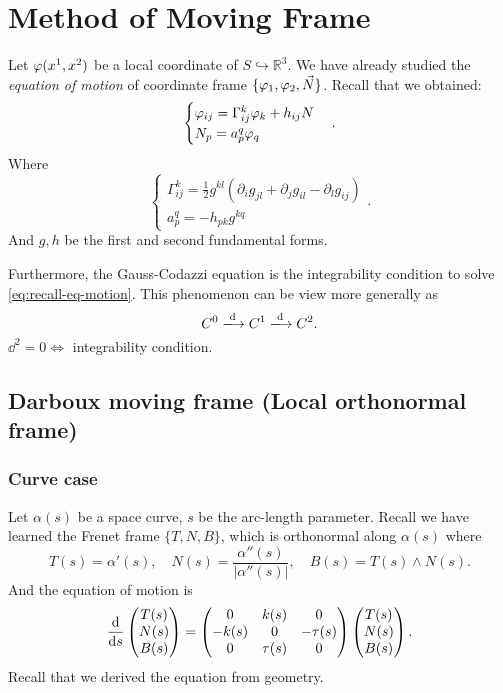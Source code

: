 \section{Method of Moving Frame}
Let \(\varphi(x^1,x^2)\) be a local coordinate of \(S\hookrightarrow\mathbb{R}^3\).
We have already studied the \emph{equation of motion} of coordinate frame \(\{\varphi_1,
\varphi_2,\vec{N}\}\). Recall that we obtained: 
\begin{equation}\label{eq:recall-eq-motion}
    \begin{cases}
        \varphi_{ij}=\Gamma_{ij}^k\varphi_k+h_{ij}N \\
        N_p=a_p^q\varphi_q
    \end{cases}
.\end{equation}
Where \[
    \begin{cases}
        \Gamma_{ij}^k=\frac{1}{2}g^{kl}(\partial_i g_{jl}+\partial_j g_{il}-\partial_l
        g_{ij}) \\
        a_p^q=-h_{pk}g^{kq}
    \end{cases}
.\] And \(g,h\) be the first and second fundamental forms.

Furthermore, the Gauss-Codazzi equation is the integrability condition to solve
\cref{eq:recall-eq-motion}. This phenomenon can be view more generally as \[
    C^0\xlongrightarrow{\dd}C^1\xlongrightarrow{\dd}C^2
.\] \(\dd^2=0\iff\) integrability condition. 

\subsection{Darboux moving frame (Local orthonormal frame)}
\subsubsection{Curve case}
Let \(\alpha(s)\) be a space curve, \(s\) be the arc-length 
parameter. Recall we have learned the Frenet frame \(\{T,N,B\}\), which is orthonormal
along \(\alpha(s)\) where \[
    T(s)=\alpha'(s),\quad N(s)=\frac{\alpha''(s)}{|\alpha''(s)|},\quad
    B(s)=T(s)\wedge N(s)
.\] And the equation of motion is \[
    \dv{s}\begin{pmatrix}
        T(s) \\ N(s) \\ B(s)
    \end{pmatrix}=\begin{pmatrix}
        0 & k(s) & 0 \\
        -k(s) & 0 & -\tau(s) \\
        0 & \tau(s) & 0
    \end{pmatrix}\begin{pmatrix}
        T(s) \\ N(s) \\ B(s)
    \end{pmatrix}
.\] Recall that we derived the equation from geometry.

